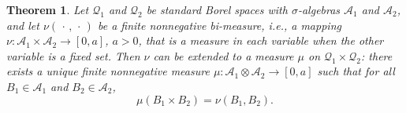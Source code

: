 \documentclass[12pt]{article}
\newcommand{\1}{\mathbf{1}} %
\newcommand{\conf}{\mathcal{Q}} %
\newcommand{\salg}{\mathcal{A}} %
\newtheorem{theorem}{Theorem}
\begin{document}
\begin{theorem}\label{sta:bimeasure}
   Let $\conf_1$ and $\conf_2$ be standard Borel spaces with
   $\sigma$-algebras $\salg_1$ and $\salg_2$, and let $\nu( \,\cdot\,,
   \,\cdot\,)$ be a finite nonnegative bi-measure, i.e., a mapping $\nu:
   \salg_1 \times \salg_2 \to [0,a]$, $a > 0$, that is a measure
   in each variable when the other variable is a fixed set. Then $\nu$
   can be extended to a measure $\mu$ on $\conf_1 \times \conf_2$:
   there exists a unique finite nonnegative measure $\mu: \salg_1
   \otimes \salg_2 \to [0,a]$ such that for all $B_1 \in \salg_1$ and
   $B_2 \in \salg_2$,
   \begin{equation}\label{bimeasure}
     \mu(B_1 \times B_2) = \nu(B_1, B_2).
   \end{equation}
\end{theorem}
\end{document}
